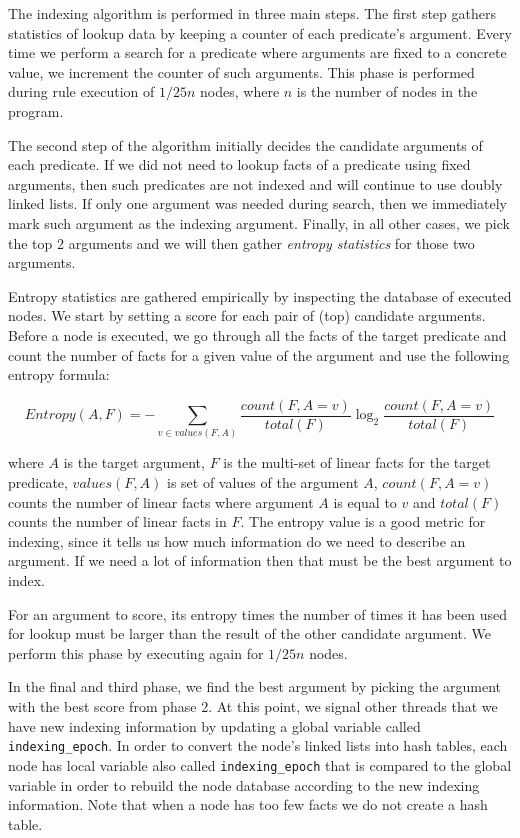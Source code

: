 The indexing algorithm is performed in three main steps. The first step gathers statistics of lookup data by keeping a counter
of each predicate's argument.
Every time we perform a search for a predicate where arguments are fixed to a concrete value, we increment the counter of such arguments. This phase is performed during rule execution of $1/25n$ nodes, where $n$ is the number of nodes in the program.

The second step of the algorithm initially decides the candidate arguments of each predicate. If we did not need to lookup
facts of a predicate using fixed arguments, then such predicates are not indexed and will continue to use doubly linked lists.
If only one argument was needed during search, then we immediately mark such argument as the indexing argument. Finally, in all
other cases, we pick the top 2 arguments and we will then gather \emph{entropy statistics} for those two arguments.

Entropy statistics are gathered empirically by inspecting the database of executed nodes. We start by setting a score
for each pair of (top) candidate arguments. Before a node is executed, we go through all the facts of the target predicate
and count the number of facts for a given value of the argument and use the following entropy formula:

\[
Entropy(A, F) = - \sum_{v \in values(F, A)} \frac{count(F, A = v)}{total(F)} 	\log_2 \frac{count(F, A = v)}{total(F)}
\]

where $A$ is the target argument, $F$ is the multi-set of linear facts for the target predicate, $values(F, A)$ is set of values of the argument $A$, $count(F, A = v)$ counts the number
of linear facts where argument $A$ is equal to $v$ and $total(F)$ counts the number of linear facts in $F$.
The entropy value is a good metric for indexing, since it tells us how much information do we need to describe an argument. If we
need a lot of information then that must be the best argument to index.

For an argument to score, its entropy times the number of times it has been used for lookup must be larger than the result of the other
candidate argument. We perform this phase by executing again for $1/25n$ nodes.

In the final and third phase, we find the best argument by picking the argument with the best score from phase 2. At this point,
we signal other threads that we have new indexing information by updating a global variable called \texttt{indexing\_epoch}.
In order to convert the node's linked lists into hash tables, each node has local variable also called \texttt{indexing\_epoch}
that is compared to the global variable in order to rebuild the node database according to the new indexing
information. Note that when a node has too few facts we do not create a hash table.

